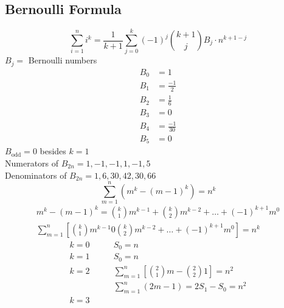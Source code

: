 \documentclass[letterpaper, 12pt]{article}
\newcommand{\0}{\emptyset}
\begin{document}
    \subsection*{Bernoulli Formula}
    \[\sum_{i=1}^{n} i^k = \frac{1}{k+1} \sum_{j=0}^{k} (-1)^j \binom{k+1}{j} B_j \cdot n^{k+1-j}\]
    $B_j = $ Bernoulli numbers \\
    \begin{align*}
        B_0 &= 1 \\
        B_1 &= \frac{-1}{2} \\
        B_2 &= \frac{1}{6} \\
        B_3 &= 0 \\
        B_4 &= \frac{-1}{30} \\
        B_5 &= 0
    \end{align*}
    $B_\text{odd} = 0$ besides $k = 1$ \\
    Numerators of $B_{2n} = 1, -1, -1, 1, -1, 5$ \\
    Denominators of $B_{2n} = 1, 6, 30, 42, 30, 66$
    \[\sum_{m=1}^{n} (m^k-(m-1)^k) = n^k\]
    \begin{gather*}
        m^k-(m-1)^k = \binom{k}{1}m^{k-1} + \binom{k}{2}m^{k-2} + \dots + (-1)^{k+1}m^0 \\
        \sum_{m=1}^{n} \left[\binom{k}{1}m^{k-1} 0 \binom{k}{2}m^{k-2} + \dots 
        + (-1)^{k+1}m^0\right] = n^k
    \end{gather*}
    \begin{align*}
        k = 0 &\qquad S_0 = n \\
        k = 1 &\qquad S_0 = n \\
        k = 2 &\qquad \sum_{m=1}^{n} \left[\binom{2}{1}m-\binom{2}{2}1\right] = n^2 \\
        &\qquad \sum_{m=1}^{n} (2m-1) = 2S_1 - S_0 = n^2 \\
        k =3 &\qquad 
    \end{align*}
\end{document}
